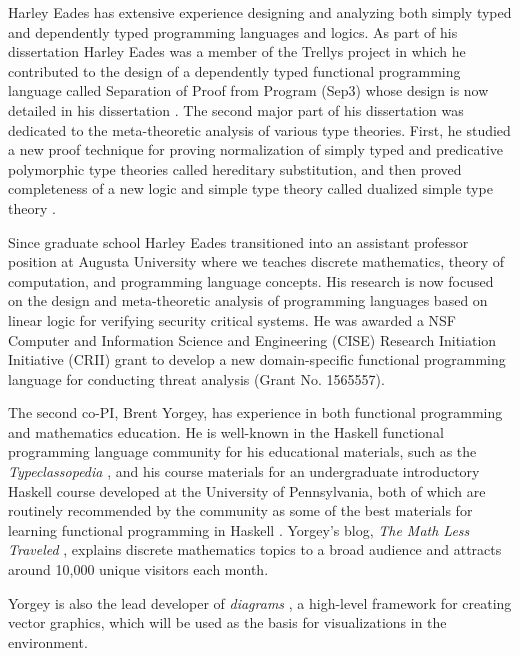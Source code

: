 Harley Eades has extensive experience designing and analyzing both
simply typed and dependently typed programming languages and
logics. As part of his dissertation Harley Eades was a member of the
Trellys project \cite{Kimmel:2013,Sjoberg:2012} in which he
contributed to the design of a dependently typed functional
programming language called Separation of Proof from Program (Sep3)
whose design is now detailed in his dissertation
\cite{Eades:2014b,Kimmel:2013}. The second major part of his
dissertation was dedicated to the meta-theoretic analysis of various
type theories. First, he studied a new proof technique for proving
normalization of simply typed and predicative polymorphic type
theories called hereditary substitution, and then proved completeness
of a new logic and simple type theory called dualized simple type
theory \cite{Eades:2014b}.

Since graduate school Harley Eades transitioned into an assistant
professor position at Augusta University where we teaches discrete
mathematics, theory of computation, and programming language
concepts. His research is now focused on the design and meta-theoretic
analysis of programming languages based on linear logic for verifying
security critical systems.  He was awarded a NSF Computer and
Information Science and Engineering (CISE) Research Initiation
Initiative (CRII) grant to develop a new domain-specific functional
programming language for conducting threat analysis (Grant
No. 1565557).


The second co-PI, Brent Yorgey, has experience in both functional
programming and mathematics education.  He is well-known in the
Haskell functional programming language community for his educational
materials, such as the \emph{Typeclassopedia} \cite{Typeclassopedia},
and his course materials for an undergraduate introductory Haskell
course developed at the University of Pennsylvania, both of which are
routinely recommended by the community as some of the best materials
for learning functional programming in Haskell \cite{bitemyapp-learn}.
Yorgey's blog, \emph{The Math Less Traveled} \cite{yorgey-tmlt}, explains
discrete mathematics topics to a broad audience and attracts around
10,000 unique visitors each month.

Yorgey is also the lead developer of \emph{diagrams} \cite{diagrams}, a
high-level framework for creating vector graphics, which will be used
as the basis for visualizations in the \thelang environment.

